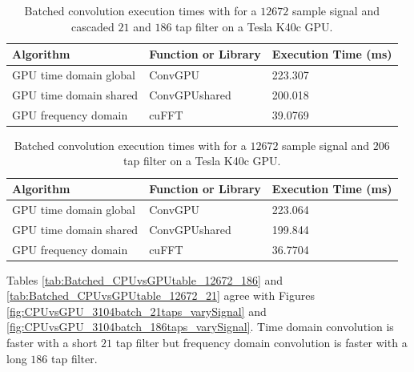 \begin{table}
\caption{Batched convolution execution times with for a $12672$ sample signal and cascaded $21$ and $186$ tap filter on a Tesla K40c GPU.}
\begin{center}
\begin{tabular}{lll}
	\toprule
	Algorithm 				& Function or Library		& Execution Time (ms) \\ \midrule
	GPU time domain global 	& ConvGPU 					& 223.307		\\
	GPU time domain shared 	& ConvGPUshared 			& 200.018		\\
	GPU frequency domain 	& cuFFT						& 39.0769		\\ 
	\bottomrule
\end{tabular}
\end{center}
\label{tab:Batched_CPUvsGPUtable_12672_21_186}
\end{table}
\begin{table}
\caption{Batched convolution execution times with for a $12672$ sample signal and $206$ tap filter on a Tesla K40c GPU.}
\begin{center}
\begin{tabular}{lll}
	\toprule
	Algorithm 				& Function or Library		& Execution Time (ms) \\ \midrule
	GPU time domain global 	& ConvGPU 					& 223.064		\\
	GPU time domain shared 	& ConvGPUshared 			& 199.844		\\
	GPU frequency domain 	& cuFFT						& 36.7704		\\ 
	\bottomrule
\end{tabular}
\end{center}
\label{tab:Batched_CPUvsGPUtable_12672_206}
\end{table}

Tables \ref{tab:Batched_CPUvsGPUtable_12672_186} and \ref{tab:Batched_CPUvsGPUtable_12672_21} agree with Figures \ref{fig:CPUvsGPU_3104batch_21taps_varySignal} and \ref{fig:CPUvsGPU_3104batch_186taps_varySignal}.
Time domain convolution is faster with a short $21$ tap filter but frequency domain convolution is faster with a long $186$ tap filter.

